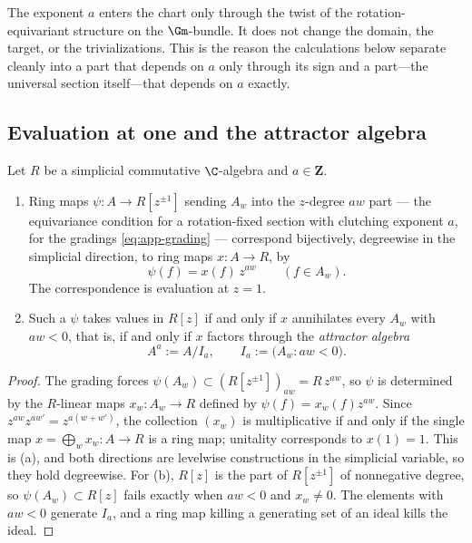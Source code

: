 \begin{remark}
\label{rem:app-exponent}
The exponent \(a\) enters the chart only through the twist of the
rotation-equivariant structure on the \(\Gm\)-bundle.  It does not change the
domain, the target, or the trivializations.  This is the reason the
calculations below separate cleanly into a part that depends on \(a\) only
through its sign and a part---the universal section itself---that depends on
\(a\) exactly.
\end{remark}

\subsection{Evaluation at one and the attractor algebra}
\label{app:attractor}

\begin{lemma}
\label{lem:app-graded-extension}
Let \(R\) be a simplicial commutative \(\C\)-algebra and \(a\in\mathbf Z\).
\begin{enumerate}[label=\textup{(\alph*)}]
\item Ring maps \(\psi\colon A\to R[z^{\pm1}]\) sending \(A_w\) into the
\(z\)-degree \(aw\) part --- the equivariance condition for a rotation-fixed
section with clutching exponent \(a\), for the gradings
\eqref{eq:app-grading} --- correspond bijectively, degreewise in the
simplicial direction, to ring maps \(x\colon A\to R\), by
\begin{equation}\label{eq:app-graded-map}
 \psi(f)=x(f)\,z^{aw}\qquad(f\in A_w).
\end{equation}
The correspondence is evaluation at \(z=1\).
\item Such a \(\psi\) takes values in \(R[z]\) if and only if \(x\) annihilates
every \(A_w\) with \(aw<0\), that is, if and only if \(x\) factors through the
\emph{attractor algebra}
\begin{equation}\label{eq:app-attractor-ideal}
 A^a:=A/I_a,\qquad I_a:=\bigl(A_w:aw<0\bigr).
\end{equation}
\end{enumerate}
\end{lemma}

\begin{proof}
The grading forces \(\psi(A_w)\subset(R[z^{\pm1}])_{aw}=R\,z^{aw}\), so
\(\psi\) is determined by the \(R\)-linear maps \(x_w\colon A_w\to R\) defined
by \(\psi(f)=x_w(f)z^{aw}\).  Since \(z^{aw}z^{aw'}=z^{a(w+w')}\), the
collection \((x_w)\) is multiplicative if and only if the single map
\(x=\bigoplus_wx_w\colon A\to R\) is a ring map; unitality corresponds to
\(x(1)=1\).  This is (a), and both directions are levelwise constructions in
the simplicial variable, so they hold degreewise.  For (b), \(R[z]\) is the
part of \(R[z^{\pm1}]\) of nonnegative degree, so \(\psi(A_w)\subset R[z]\)
fails exactly when \(aw<0\) and \(x_w\neq0\).  The elements with \(aw<0\)
generate \(I_a\), and a ring map killing a generating set of an ideal kills the
ideal.
\end{proof}

